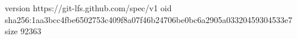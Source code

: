 version https://git-lfs.github.com/spec/v1
oid sha256:1aa3bcc4fbe6502753c409f8a07f46b24706be0bc6a2905a03320459304533e7
size 92363
